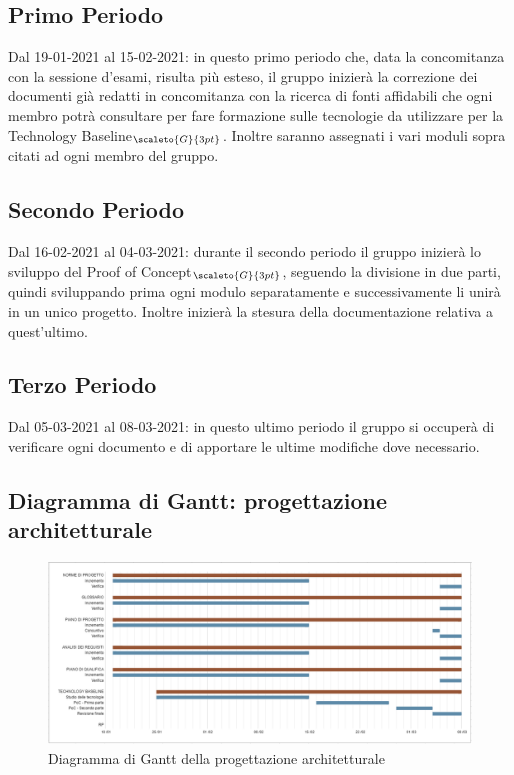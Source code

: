 \begin{itemize}
\begin{itemize}
	\end{itemize}
\end{itemize}
\subsection{Primo Periodo}\label{PianificazioneProgettazioneArchitetturalePrimoPeriodo}
Dal 19-01-2021 al 15-02-2021: in questo primo periodo che, data la concomitanza con la sessione d'esami, risulta più esteso,  il gruppo inizierà la correzione dei documenti già redatti in concomitanza con la ricerca di fonti affidabili che ogni membro potrà consultare per fare formazione sulle tecnologie da utilizzare per la Technology Baseline$_{\scaleto{G}{3pt}}$. Inoltre saranno assegnati i vari moduli sopra citati ad ogni membro del gruppo.
\subsection{Secondo Periodo}\label{PianificazioneProgettazioneArchitetturaleSecondoPeriodo}
Dal 16-02-2021 al 04-03-2021: durante il secondo periodo il gruppo inizierà lo sviluppo del Proof of Concept$_{\scaleto{G}{3pt}}$, seguendo la divisione in due parti, quindi sviluppando prima ogni modulo separatamente e successivamente li unirà in un unico progetto. Inoltre inizierà la stesura della documentazione relativa a quest'ultimo.
\subsection{Terzo Periodo}\label{PianificazioneProgettazioneArchitetturaleTerzoPeriodo}
Dal 05-03-2021 al 08-03-2021: in questo ultimo periodo il gruppo si occuperà di verificare ogni documento e di apportare le ultime modifiche dove necessario.

\subsection{Diagramma di Gantt: progettazione architetturale}\label{PianificazioneDiagrammaDiGanttProgettazioneArchitetturale}
\begin{figure}[h]
	\begin{center}
		\includegraphics[width=0.9\linewidth]{../immagini/pdp/gantt_progettazione_architetturale2.png}
		\caption{Diagramma di Gantt della progettazione architetturale}
	\end{center}
\end{figure}
\clearpage
